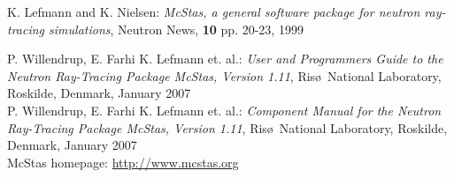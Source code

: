 \begin{thebibliography}{10}
K. Lefmann and K. Nielsen: \emph{McStas, a general software package
  for neutron ray-tracing simulations}, Neutron News, {\bf 10} pp. 20-23, 1999

P. Willendrup, E. Farhi K. Lefmann et. al.: \emph{User and Programmers
  Guide to the Neutron Ray-Tracing Package McStas, Version 1.11}, Ris\o\
National Laboratory, Roskilde, Denmark, January 2007\\
P. Willendrup, E. Farhi K. Lefmann et. al.: \emph{Component Manual for
 the Neutron Ray-Tracing Package McStas, Version 1.11}, Ris\o\
National Laboratory, Roskilde, Denmark, January 2007\\

McStas homepage: \url{http://www.mcstas.org}\\
\end{thebibliography}



